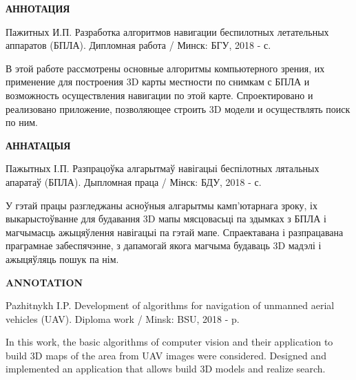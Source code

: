 \begin{center}
     \large\bfseries{АННОТАЦИЯ}
\end{center}

Пажитных И.П. Разработка алгоритмов навигации беспилотных летательных аппаратов (БПЛА). Дипломная работа / Минск: БГУ, 2018 - \pageref{LastPage} с.

В этой работе рассмотрены основные алгоритмы компьютерного зрения, их применение для построения 3D карты местности по снимкам с БПЛА и возможность осуществления навигации по этой карте. Спроектировано и реализовано приложение, позволяющее строить 3D модели и осуществлять поиск по ним.

\begin{center}
     \large\bfseries{АННАТАЦЫЯ}
\end{center}

Пажытных І.П. Разпрацоўка алгарытмаў навігацыі беспілотных лятальных апаратаў (БПЛА). Дыпломная праца / Мінск: БДУ, 2018 - \pageref{LastPage} с.

У гэтай працы разгледжаны асноўныя алгарытмы камп'ютарнага зроку, іх выкарыстоўванне для будавання 3D мапы мясцовасьці па здымках з БПЛА і магчымасць ажыцяўлення навігацыі па гэтай мапе. Спраектавана і разпрацавана праграмнае забеспячэнне, з дапамогай якога магчыма будаваць 3D мадэлі і ажыцяўляць пошук па нім.

\begin{center}
     \large\bfseries{ANNOTATION}
\end{center}

Pazhitnykh I.P. Development of algorithms for navigation of unmanned aerial vehicles (UAV). Diploma work / Minsk: BSU, 2018 - \pageref{LastPage} p.

In this work, the basic algorithms of computer vision and their application to build 3D maps of the area from UAV images were considered. Designed and implemented an application that allows build 3D models and realize search.

\newpage
